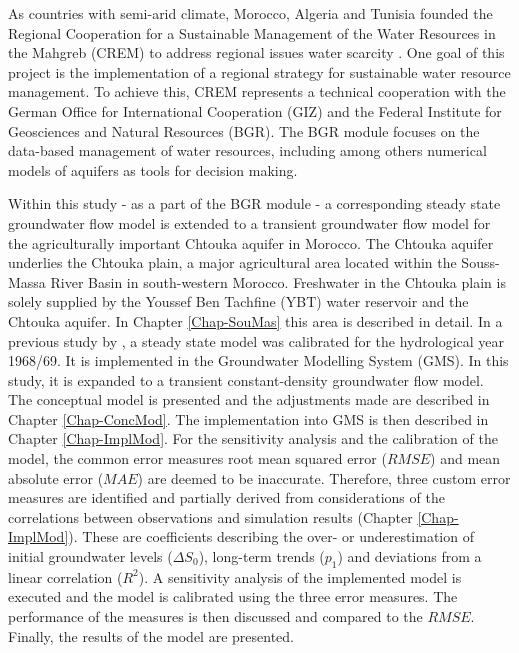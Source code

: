 As countries with semi-arid climate, Morocco, Algeria and Tunisia founded the Regional Cooperation for a Sustainable Management of the Water Resources in the Mahgreb (CREM) to address regional issues water scarcity \parencite{OSS.2023}. 
One goal of this project is the implementation of a regional strategy for sustainable water resource management. 
To achieve this, CREM represents a technical cooperation with the German Office for International Cooperation (GIZ) and the Federal Institute for Geosciences and Natural Resources (BGR). 
The BGR module focuses on the data-based management of water resources, including among others numerical models of aquifers as tools for decision making. 

Within this study - as a part of the BGR module - a corresponding steady state groundwater flow model is extended to a transient groundwater flow model for the agriculturally important Chtouka aquifer in Morocco. 
The Chtouka aquifer underlies the Chtouka plain, a major agricultural area located within the Souss-Massa River Basin in south-western Morocco. 
Freshwater in the Chtouka plain is solely supplied by the Youssef Ben Tachfine (YBT) water reservoir and the Chtouka aquifer. 
In Chapter \ref{Chap-SouMas} this area is described in detail. 
In a previous study by \textcite{Horn.2021}, a steady state model was calibrated for the hydrological year 1968/69. 
It is implemented in the Groundwater Modelling System (GMS). 
In this study, it is expanded to a transient constant-density groundwater flow model. 
The conceptual model is presented and the adjustments made are described in Chapter \ref{Chap-ConcMod}. 
The implementation into GMS is then described in Chapter \ref{Chap-ImplMod}. 
For the sensitivity analysis and the calibration of the model, the common error measures root mean squared error ($RMSE$) and mean absolute error ($MAE$) are deemed to be inaccurate. 
Therefore, three custom error measures are identified and partially derived from considerations of the correlations between observations and simulation results (Chapter \ref{Chap-ImplMod}). 
These are coefficients describing the over- or underestimation of initial groundwater levels ($\Delta S_0$), long-term trends ($p_1$) and deviations from a linear correlation ($R^2$). 
A sensitivity analysis of the implemented model is executed and the model is calibrated using the three error measures. 
The performance of the measures is then discussed and compared to the $RMSE$. 
Finally, the results of the model are presented.